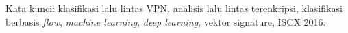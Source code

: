 	\bigskip

	Kata kunci:	klasifikasi lalu lintas VPN, analisis lalu lintas terenkripsi, klasifikasi berbasis \textit{flow}, \textit{machine learning}, \textit{deep learning}, vektor signature, ISCX 2016.

\newpage